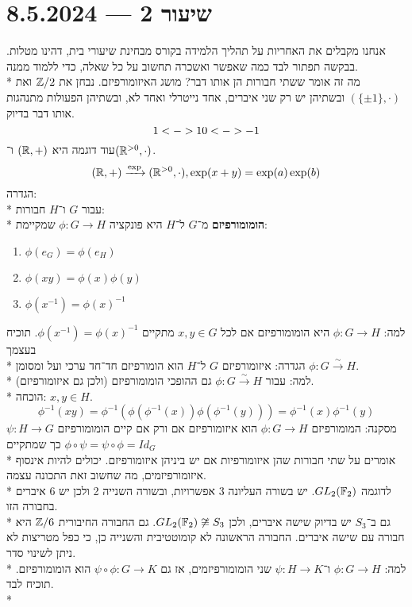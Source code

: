 \section{שיעור 2 --- 8.5.2024}
אנחנו מקבלים את האחריות על תהליך הלמידה בקורס מבחינת שיעורי בית, דהינו מטלות. בבקשה תפתור לבד כמה שאפשר ואשכרה תחשוב על כל שאלה, כדי ללמוד ממנה. \\*
מה זה אומר ששתי חבורות הן אותו דבר?  מושג האיזומורפיזם.
נבחן את $\mathbb{Z}/2$ ואת $(\{\pm 1\}, \cdot)$ ובשתיהן יש רק שני איברים, אחד נייטרלי ואחד לא, ובשתיהן הפעולות מתנהגות אותו דבר בדיוק.
\[
	1 <-> 1 \\
	0 <-> -1
\]
עוד דוגמה היא $(\mathbb{R}, +)$ ו־$(\mathbb{R}^{>0}, \cdot)$.
\[
	(\mathbb{R}, +) \xrightarrow{\exp} (\mathbb{R}^{>0}, \cdot), \exp(x + y) = \exp(a) \exp(b)
\]
הגדרה: \\*
עבור $G$ ו־$H$ חבורות: \\*
\textbf{הומומורפיזם} מ־$G$ ל־$H$ היא פונקציה $\phi : G \to H$ שמקיימת:
\begin{enumerate}
	\item $\phi(e_G) = \phi(e_H)$
	\item $\phi(x y) = \phi(x) \phi(y)$
	\item $\phi(x^{-1}) = {\phi(x)}^{-1}$
\end{enumerate}
למה: $\phi : G \to H$ היא הומומורפיזם אם לכל $x, y \in G$ מתקיים $\phi(x^{-1}) = {\phi(x)}^{-1}$. תוכיח בעצמך \\*
הגדרה: איזומורפיזם $G$ ל־$H$ הוא הומורפיזם חד־חד ערכי ועל ומסומן $\phi : G \xrightarrow{\sim} H$. \\*
למה: עבור $\phi : G \xrightarrow{\sim} H$ גם ההופכי הומומורפיזם (ולכן גם איזומורפיזם). \\*
הוכחה: $x, y \in H$. 
\[
	\phi^{-1}(xy)
	= \phi^{-1}(\phi(\phi^{-1}(x)) \phi(\phi^{-1}(y)))
	= \phi^{-1}(x) \phi^{-1}(y)
\]
מסקנה:  המומורפיזם $\phi : G \to H$ הוא איזומורפיזם אם ורק אם קיים הומומורפיזם $\psi : H \to G$ כך שמתקיים $\phi \circ \psi = \psi \circ \phi = Id_G$ \\*
אומרים על שתי חבורות שהן איזומורפיות אם יש ביניהן איזומורפיזם. יכולים להיות אינסוף איזומורפיזמים, מה שחשוב זאת התכונה עצמה. \\*
לדוגמה $GL_2(\mathbb{F}_2)$. יש בשורה העליונה 3 אפשרויות, ובשורה השנייה 2 ולכן יש 6 איברים בחבורה הזו. \\*
גם ב־$S_3$ יש בדיוק שישה איברים, ולכן $GL_2(\mathbb{F}_2) \not\cong S_3$. גם החבורה החיבורית $\mathbb{Z}/6$ היא חבורה עם שישה איברים. החבורה הראשונה לא קומוטטיבית והשנייה כן, כי כפל מטריצות לא ניתן לשינוי סדר. \\*
למה: $\phi : G \to H$ ו־$\psi : H \to K$ שני הומומורפיזמים, אז גם $\psi \circ \phi : G \to K$ הוא הומומורפיזם. תוכיח לבד. \\*
